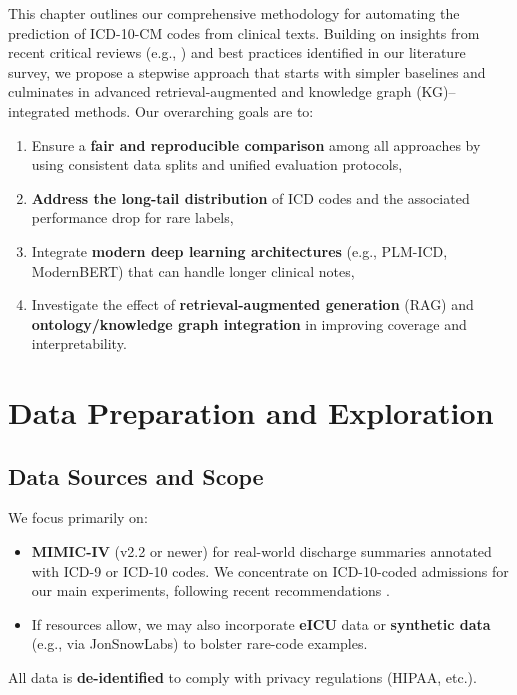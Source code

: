 \documentclass[12pt,a4paper]{report}
\begin{document}
This chapter outlines our comprehensive methodology for automating the prediction of ICD-10-CM codes from clinical texts. Building on insights from recent critical reviews (e.g., \cite{edin2023automated,nguyen2023mimicivicd}) and best practices identified in our literature survey, we propose a stepwise approach that starts with simpler baselines and culminates in advanced retrieval-augmented and knowledge graph (KG)–integrated methods. Our overarching goals are to:

\begin{enumerate}
    \item Ensure a \textbf{fair and reproducible comparison} among all approaches by using consistent data splits and unified evaluation protocols,
    \item \textbf{Address the long-tail distribution} of ICD codes and the associated performance drop for rare labels,
    \item Integrate \textbf{modern deep learning architectures} (e.g., PLM-ICD, ModernBERT) that can handle longer clinical notes,
    \item Investigate the effect of \textbf{retrieval-augmented generation} (RAG) and \textbf{ontology/knowledge graph integration} in improving coverage and interpretability.
\end{enumerate}

\section{Data Preparation and Exploration}

\subsection{Data Sources and Scope}
We focus primarily on:
\begin{itemize}
    \item \textbf{MIMIC-IV} (v2.2 or newer) for real-world discharge summaries annotated with ICD-9 or ICD-10 codes. We concentrate on ICD-10-coded admissions for our main experiments, following recent recommendations \cite{edin2023automated}.
    \item If resources allow, we may also incorporate \textbf{eICU} data or \textbf{synthetic data} (e.g., via JonSnowLabs) to bolster rare-code examples.
\end{itemize}
All data is \textbf{de-identified} to comply with privacy regulations (HIPAA, etc.).
\end{document}
